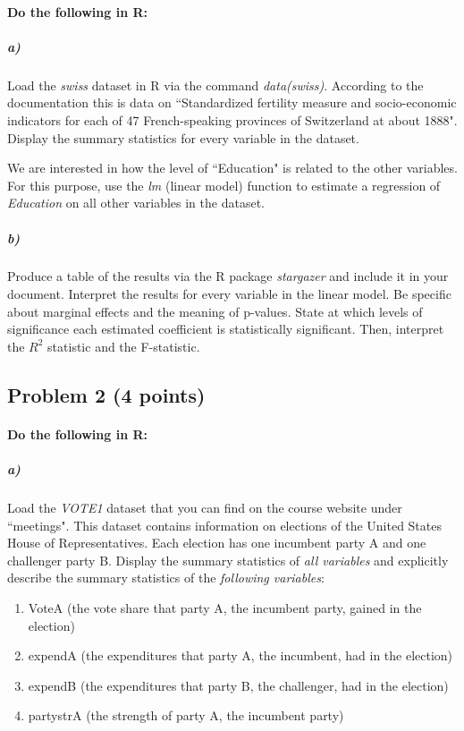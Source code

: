 \documentclass[12pt]{article}
\begin{document}
\paragraph{Do the following in R:}

\subparagraph{a)} Load the \textit{swiss} dataset in R via the command \textit{data(swiss)}. According to the documentation this is data on ``Standardized fertility measure and socio-economic indicators for each of 47 French-speaking provinces of Switzerland at about 1888". Display the summary statistics for every variable in the dataset.

We are interested in how the level of ``Education" is related to the other variables. For this purpose, use the \textit{lm} (linear model) function to estimate a regression of \textit{Education} on all other variables in the dataset.

\subparagraph{b)} Produce a table of the results via the R package \textit{stargazer} and include it in your document. Interpret the results for every variable in the linear model. Be specific about marginal effects and the meaning of p-values. State at which levels of significance each estimated coefficient is statistically significant. Then, interpret the $R^2$ statistic and the F-statistic.



\subsection*{Problem 2 (4 points)}

\paragraph{Do the following in R:}

\subparagraph{a)} Load the \textit{VOTE1} dataset that you can find on the course website under ``meetings". This dataset contains information on elections of the United States House of Representatives. Each election has one incumbent party A and one challenger party B. Display the summary statistics of \textit{all variables} and explicitly describe the summary statistics of the \textit{following variables}:

\begin{enumerate}
	\item VoteA (the vote share that party A, the incumbent party, gained in the election)
	\item expendA (the expenditures that party A, the incumbent, had in the election)
	\item expendB (the expenditures that party B, the challenger, had in the election)
	\item partystrA (the strength of party A, the incumbent party)
\end{enumerate}
\end{document}
